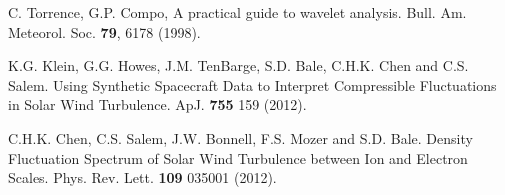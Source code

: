 \documentclass[aip,prl,amsmath,amssymb,reprint,superscriptaddress]{revtex4-1} %
\begin{document}
\begin{thebibliography}{99}
C. Torrence, G.P. Compo, A practical guide to wavelet analysis. Bull. Am. Meteorol. Soc. {\bf 79}, 6178 (1998).

 K.G. Klein, G.G. Howes, J.M. TenBarge, S.D. Bale, C.H.K. Chen and C.S. Salem. Using Synthetic Spacecraft Data to Interpret Compressible Fluctuations in Solar Wind Turbulence. ApJ. {\bf 755} 159 (2012).

 C.H.K. Chen, C.S. Salem, J.W. Bonnell, F.S. Mozer and S.D. Bale. Density Fluctuation Spectrum of Solar Wind Turbulence between Ion and Electron Scales. Phys. Rev. Lett. {\bf 109} 035001 (2012).














\end{thebibliography}
\end{document}
